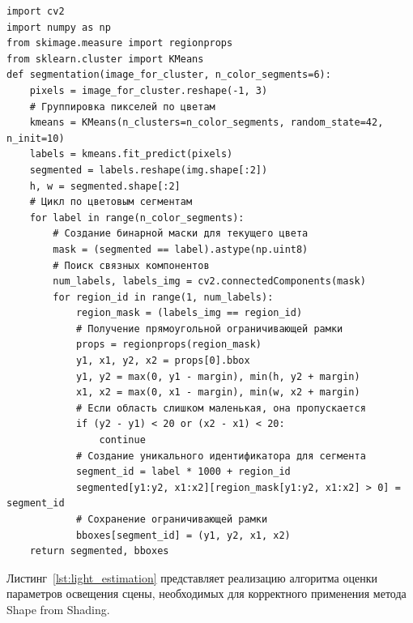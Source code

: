 \begin{center}
    \begin{lstlisting}[label=lst:segmentation,caption=Сегментация изображения]
import cv2
import numpy as np
from skimage.measure import regionprops
from sklearn.cluster import KMeans
def segmentation(image_for_cluster, n_color_segments=6):
    pixels = image_for_cluster.reshape(-1, 3)
    # Группировка пикселей по цветам
    kmeans = KMeans(n_clusters=n_color_segments, random_state=42, n_init=10)
    labels = kmeans.fit_predict(pixels)
    segmented = labels.reshape(img.shape[:2])
    h, w = segmented.shape[:2]
    # Цикл по цветовым сегментам
    for label in range(n_color_segments):
        # Создание бинарной маски для текущего цвета
        mask = (segmented == label).astype(np.uint8)
        # Поиск связных компонентов
        num_labels, labels_img = cv2.connectedComponents(mask)
        for region_id in range(1, num_labels):
            region_mask = (labels_img == region_id)
            # Получение прямоугольной ограничивающей рамки
            props = regionprops(region_mask)
            y1, x1, y2, x2 = props[0].bbox
            y1, y2 = max(0, y1 - margin), min(h, y2 + margin)
            x1, x2 = max(0, x1 - margin), min(w, x2 + margin)
            # Если область слишком маленькая, она пропускается
            if (y2 - y1) < 20 or (x2 - x1) < 20:
                continue
            # Создание уникального идентификатора для сегмента
            segment_id = label * 1000 + region_id
            segmented[y1:y2, x1:x2][region_mask[y1:y2, x1:x2] > 0] = segment_id
            # Сохранение ограничивающей рамки
            bboxes[segment_id] = (y1, y2, x1, x2)
    return segmented, bboxes
    \end{lstlisting}
\end{center}

Листинг~\ref{lst:light_estimation} представляет реализацию алгоритма оценки параметров освещения сцены, необходимых для корректного применения метода Shape from Shading.

